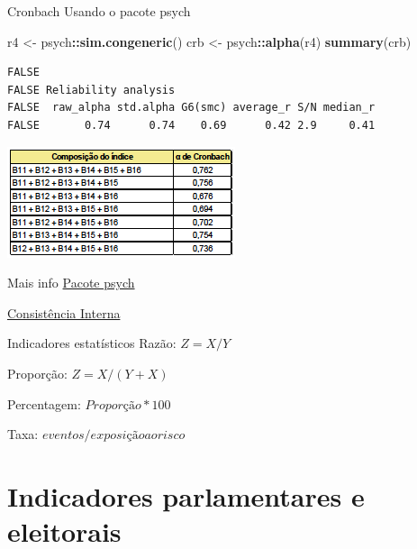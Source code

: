 \documentclass[
  9pt,
  ignorenonframetext,
  aspectratio=169]{beamer}
\newenvironment{Shaded}{\begin{snugshade}}{\end{snugshade}}
\newcommand{\KeywordTok}[1]{\textcolor[rgb]{0.13,0.29,0.53}{\textbf{#1}}}
\newcommand{\NormalTok}[1]{#1}
\newcommand{\OperatorTok}[1]{\textcolor[rgb]{0.81,0.36,0.00}{\textbf{#1}}}
\newcommand{\StringTok}[1]{\textcolor[rgb]{0.31,0.60,0.02}{#1}}
\begin{document}
\begin{frame}[fragile]{Cronbach}
\protect\hypertarget{cronbach}{}
Usando o pacote psych

\begin{Shaded}
\begin{Highlighting}[]
\NormalTok{r4 \textless{}{-}}\StringTok{ }\NormalTok{psych}\OperatorTok{::}\KeywordTok{sim.congeneric}\NormalTok{()}
\NormalTok{crb \textless{}{-}}\StringTok{ }\NormalTok{psych}\OperatorTok{::}\KeywordTok{alpha}\NormalTok{(r4)}
\KeywordTok{summary}\NormalTok{(crb)}
\end{Highlighting}
\end{Shaded}

\begin{verbatim}
FALSE 
FALSE Reliability analysis   
FALSE  raw_alpha std.alpha G6(smc) average_r S/N median_r
FALSE       0.74      0.74    0.69      0.42 2.9     0.41
\end{verbatim}
\end{frame}

\begin{frame}{}
\protect\hypertarget{section-3}{}
\includegraphics{imgs/result_exemplo.png}
\end{frame}

\begin{frame}{Mais info}
\protect\hypertarget{mais-info}{}
\href{http://personality-project.org/r/psych/}{Pacote psych}

\href{https://www.r-bloggers.com/2016/08/five-ways-to-calculate-internal-consistency/}{Consistência
Interna}
\end{frame}

\begin{frame}{Indicadores estatísticos}
\protect\hypertarget{indicadores-estatuxedsticos}{}
Razão: \(Z=X/Y\)

Proporção: \(Z=X/(Y+X)\)

Percentagem: \(Proporção*100\)

Taxa: \(eventos/exposição ao risco\)
\end{frame}

\hypertarget{indicadores-parlamentares-e-eleitorais}{%
\section{Indicadores parlamentares e
eleitorais}\label{indicadores-parlamentares-e-eleitorais}}
\end{document}

